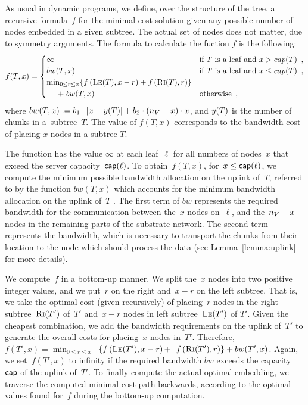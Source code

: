 As usual in dynamic programs, we define, over the structure of the tree, a
recursive formula~$f$ for
the minimal cost solution given any possible number of nodes
embedded in a given subtree. The actual set of nodes does not matter,
due to symmetry arguments.
The formula to calculate the fuction $f$ is the following:
\[
  f(T, x) = 
  \begin{cases}
    \infty & \mbox{if } T \mbox{ is a leaf and } x > cap(T)\enspace,\\
    bw(T, x) & \mbox{if } T \mbox{ is a leaf and } x \leq cap(T)\enspace, \\
    \min_{0\leq r \leq x} \{  f\left(\textsc{Le}(T),
x-r\right) +
f\left(\textsc{Ri}(T), r\right) \}&\\\hspace{0.5cm} + \hspace{0.1cm} bw(T,x) &  \mbox{otherwise}\enspace,
  \end{cases}
  \]
where $bw(T,x) := b_1 \cdot |x - y(T)| +b_2 \cdot
(n_V - x) \cdot x$, and $y(T)$ is the number of chunks in a~subtree~$T$.
The value of $f(T, x)$ corresponds to the bandwidth cost of placing $x$ nodes in a subtree $T$.

The function has the value $\infty$ at each leaf~$\ell$
for all numbers of nodes~$x$ that exceed
the server capacity~$\textsf{cap}(\ell)$.
To obtain~$f(T, x)$, for~$x \leq \textsf{cap}(\ell)$, we compute the
minimum possible bandwidth allocation on the uplink of~$T$, referred to by the function
$bw(T,x)$ which accounts for the minimum bandwidth allocation on the uplink of~$T$
. The
first
term of $bw$ represents the required bandwidth for the communication between the~$x$
nodes on~$\ell$, and the~$n_V - x$ nodes in the remaining parts of the substrate
network.
The second term represents
the bandwidth, which is necessary to transport the chunks from their location to
the node which should process the data (see Lemma~\ref{lemma:uplink} for more
details).

We compute~$f$ in a bottom-up manner. We split the~$x$ nodes
into two positive integer
values, and we put~$r$ on the right and~$x - r$ on the left subtree.
That is, we take the optimal cost
(given recursively) of placing~$r$ nodes in
the right subtree~$\textsc{Ri}(T')$ of~$T'$ and~$x-r$ nodes in left subtree~$\textsc{Le}(T')$ of
$T'$. Given the cheapest combination, we add the bandwidth requirements
on the uplink of~$T'$ to generate the overall costs for placing~$x$ nodes in~$T'$.
Therefore,~$f(T',x) =   \min_{0\leq r \leq x}$~$ \{  f\left(\textsc{Le}(T'),
x-r\right) +$~$
f\left(\textsc{Ri}(T'), r\right) \} + bw(T',x)$.
Again, we set~$f(T',x)$ to infinity if the required bandwidth
$bw$ exceeds the capacity~$\textsf{cap}$ of the uplink of~$T'$.
To finally compute the actual optimal embedding,
we traverse the computed minimal-cost path backwards,
according to
the optimal values found for~$f$ during the bottom-up computation.


